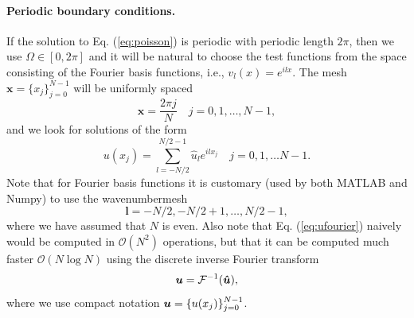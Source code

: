 \documentclass[%
oneside,                 %
final,                   %
10pt]{article}
\begin{document}
\paragraph{Periodic boundary conditions.}
\label{sec:fourierpoisson}
If the solution to Eq. (\ref{eq:poisson}) is periodic with periodic length $2 \pi$, then we use $\Omega \in [0, 2 \pi]$ and it will be natural to choose the test functions from the space consisting of the Fourier basis functions, i.e.,  $v_l(x)=e^{ilx}$. The mesh $\boldsymbol{x} = \{x_j\}_{j=0}^{N-1}$ will be uniformly spaced 
\begin{equation}
\boldsymbol{x} = \frac{2 \pi j}{N}  \quad j=0,1,\ldots, N-1,
\end{equation}
and we look for solutions of the form
\begin{equation}
u(x_j) = \sum_{l=-N/2}^{N/2-1} \hat{u}_l e^{ilx_j} \quad  j=0,1,\ldots N-1.
\label{eq:ufourier}
\end{equation}
Note that for Fourier basis functions it is customary (used by both MATLAB and Numpy) to use the wavenumbermesh
\begin{equation}
\boldsymbol{l} = -N/2, -N/2+1, \ldots, N/2-1, \label{eq:wavenumber_even}
\end{equation}
where we have assumed that $N$ is even. Also note that Eq. (\ref{eq:ufourier}) naively would be computed in $\mathcal{O}(N^2)$ operations, but that it can be computed much faster $\mathcal{O}(N\log N)$ using the discrete inverse Fourier transform
\begin{equation}
\boldsymbol{u} = \mathcal{F}^{-1}(\boldsymbol{\hat{u}}),
\end{equation}
where we use compact notation $\boldsymbol{u} = \{u(x_j)\}_{j=0}^{N-1}$.
\end{document}
